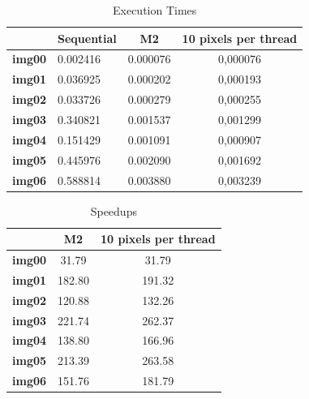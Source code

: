 \documentclass[a4paper]{article}
\begin{document}
\begin{table}[!ht]
\centering
\begin{tabular}{|c|l|c|c|}
\hline
               & \textbf{Sequential} & \textbf{M2} & \textbf{10 pixels per thread} \\ \hline
\textbf{img00} & 0.002416            & 0.000076    & 0,000076                      \\ \hline
\textbf{img01} & 0.036925            & 0.000202    & 0,000193                      \\ \hline
\textbf{img02} & 0.033726            & 0.000279    & 0,000255                      \\ \hline
\textbf{img03} & 0.340821            & 0.001537    & 0,001299                      \\ \hline
\textbf{img04} & 0.151429            & 0.001091    & 0,000907                      \\ \hline
\textbf{img05} & 0.445976            & 0.002090    & 0,001692                      \\ \hline
\textbf{img06} & 0.588814            & 0.003880    & 0,003239                      \\ \hline
\end{tabular}
\caption{Execution Times}
\label{tab:darker_ex}
\end{table}
\FloatBarrier

\begin{table}[!ht]
\centering
\begin{tabular}{|c|c|c|}
\hline
               & \textbf{M2} & \textbf{10 pixels per thread} \\ \hline
\textbf{img00} & 31.79       & 31.79                         \\ \hline
\textbf{img01} & 182.80      & 191.32                        \\ \hline
\textbf{img02} & 120.88      & 132.26                        \\ \hline
\textbf{img03} & 221.74      & 262.37                        \\ \hline
\textbf{img04} & 138.80      & 166.96                        \\ \hline
\textbf{img05} & 213.39      & 263.58                        \\ \hline
\textbf{img06} & 151.76      & 181.79                        \\ \hline
\end{tabular}
\caption{Speedups}
\label{tab:darker_sp}
\end{table}
\FloatBarrier
\end{document}

